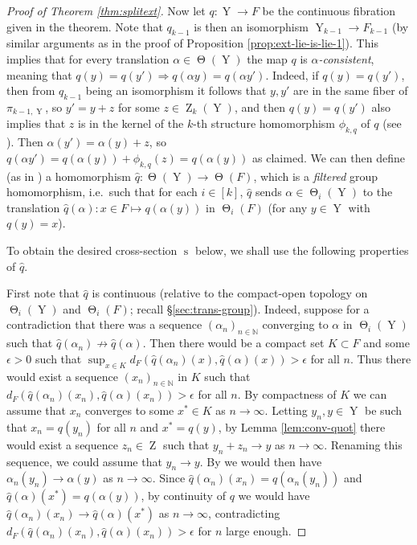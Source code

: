 \documentclass[a4paper,12pt,reqno]{amsart}
\theoremstyle{definition}
\def\to{\rightarrow}
\newcommand{\mb}{\mathbb}
\newcommand{\wh}{\widehat}
\DeclareMathOperator{\ab}{Z}
\DeclareMathOperator{\tran}{\Theta}
\DeclareMathOperator{\nss}{Y}
\DeclareMathOperator{\cs}{s}
\begin{document}
\begin{proof}[Proof of Theorem \ref{thm:splitext}]
Now let $q:\nss\to F$ be the continuous fibration given in the theorem. Note that $q_{k-1}$ is then an isomorphism $\nss_{k-1}\to F_{k-1}$ (by similar arguments as in the proof of Proposition \ref{prop:ext-lie-is-lie-1}). This implies that for every translation $\alpha\in\tran(\nss)$ the map $q$ is \emph{$\alpha$-consistent}, meaning that  $q(y)=q(y')\Rightarrow q(\alpha y)=q(\alpha y')$. Indeed, if $q(y)=q(y')$, then from $q_{k-1}$ being an isomorphism it follows that $y,y'$ are in the same fiber of $\pi_{k-1,\nss}$, so $y'=y+z$ for some $z\in\ab_k(\nss)$, and then $q(y)=q(y')$ also implies that $z$ is in the kernel of the $k$-th structure homomorphism $\phi_{k,q}$ of $q$ (see \cite[Definition 3.3.1]{Cand:Notes1}). Then $\alpha (y')=\alpha(y)+ z$, so $q(\alpha y')=q(\alpha(y))+ \phi_{k,q}(z)=q(\alpha(y))$ as claimed. We can then define (as in \cite[Lemma 1.5]{CGSS}) a homomorphism $\wh{q}:\tran(\nss) \to \tran(F)$, which is a \emph{filtered} group homomorphism, i.e.\ such that for each $i\in [k]$, $\wh{q}$ sends $\alpha\in \tran_i(\nss)$ to the translation $\wh{q}(\alpha): x\in F\mapsto q(\alpha(y))$ in $\tran_i(F)$ (for any $y\in \nss$ with $q(y)=x$).

To obtain the desired cross-section $\cs$ below, we shall use the following properties of $\wh{q}$. 

First note that $\wh{q}$ is continuous (relative to the compact-open topology on $\tran_i(\nss)$ and $\tran_i(F)$; recall \S \ref{sec:trans-group}). Indeed, suppose for a contradiction that there was a sequence $(\alpha_n)_{n\in \mb{N}}$ converging to $\alpha$ in $\tran_i(\nss)$ such that $\wh{q}(\alpha_n)\not\to \wh{q}(\alpha)$. Then there would be a compact set $K\subset F$ and some $\epsilon>0$ such that $\sup_{x\in K}d_F(\wh{q}(\alpha_n)(x),\wh{q}(\alpha)(x))>\epsilon$ for all $n$. Thus there would exist a sequence $(x_n)_{n\in \mb{N}}$ in $K$ such that $d_F(\wh{q}(\alpha_n)(x_n),\wh{q}(\alpha)(x_n))>\epsilon$ for all $n$. By compactness of $K$ we can assume that $x_n$ converges to some $x^*\in K$ as $n\to\infty$. Letting $y_n,y\in\nss$ be such that $x_n=q(y_n)$ for all $n$ and $x^*=q(y)$, by Lemma \ref{lem:conv-quot} there would exist a sequence $z_n\in \ab$ such that $y_n+z_n\to y$ as $n\to\infty$. Renaming this sequence, we could assume that $y_n\to y$. By \cite[Theorem 46.10]{Mu} we would then have  $\alpha_n(y_n)\to \alpha(y)$ as $n\to \infty$. Since $\wh{q}(\alpha_n)(x_n)=q(\alpha_n(y_n))$ and $\wh{q}(\alpha)(x^*)=q(\alpha(y))$, by continuity of $q$ we would have $\wh{q}(\alpha_n)(x_n)\to \wh{q}(\alpha)(x^*)$ as $n\to\infty$, contradicting $d_F(\wh{q}(\alpha_n)(x_n),\wh{q}(\alpha)(x_n))>\epsilon$ for $n$ large enough.


\end{proof}
\end{document}
